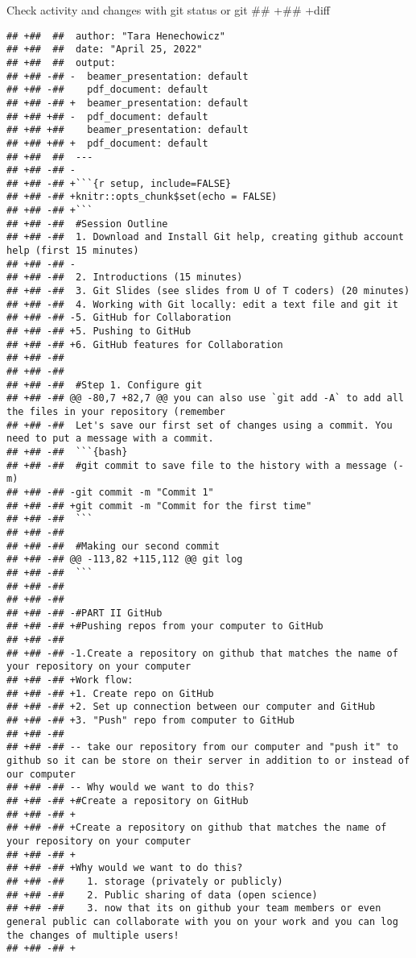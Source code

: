 \documentclass[ignorenonframetext,]{beamer}
\begin{document}
\begin{frame}[fragile]{Check activity and changes with git status or git
## +## +diff}
\begin{verbatim}
## +##  ##  author: "Tara Henechowicz"
## +##  ##  date: "April 25, 2022"
## +##  ##  output:
## +## -## -  beamer_presentation: default
## +## -##    pdf_document: default
## +## -## +  beamer_presentation: default
## +## +## -  pdf_document: default
## +## +##    beamer_presentation: default
## +## +## +  pdf_document: default
## +##  ##  ---
## +## -## -
## +## -## +```{r setup, include=FALSE}
## +## -## +knitr::opts_chunk$set(echo = FALSE)
## +## -## +```
## +## -##  #Session Outline
## +## -##  1. Download and Install Git help, creating github account help (first 15 minutes)
## +## -## -
## +## -##  2. Introductions (15 minutes)
## +## -##  3. Git Slides (see slides from U of T coders) (20 minutes)
## +## -##  4. Working with Git locally: edit a text file and git it
## +## -## -5. GitHub for Collaboration
## +## -## +5. Pushing to GitHub
## +## -## +6. GitHub features for Collaboration
## +## -##  
## +## -##    
## +## -##  #Step 1. Configure git
## +## -## @@ -80,7 +82,7 @@ you can also use `git add -A` to add all the files in your repository (remember
## +## -##  Let's save our first set of changes using a commit. You need to put a message with a commit.
## +## -##  ```{bash}
## +## -##  #git commit to save file to the history with a message (-m)
## +## -## -git commit -m "Commit 1"
## +## -## +git commit -m "Commit for the first time"
## +## -##  ```
## +## -##  
## +## -##  #Making our second commit
## +## -## @@ -113,82 +115,112 @@ git log
## +## -##  ```
## +## -##  
## +## -##  
## +## -## -#PART II GitHub
## +## -## +#Pushing repos from your computer to GitHub
## +## -##  
## +## -## -1.Create a repository on github that matches the name of your repository on your computer
## +## -## +Work flow: 
## +## -## +1. Create repo on GitHub
## +## -## +2. Set up connection between our computer and GitHub
## +## -## +3. "Push" repo from computer to GitHub
## +## -##  
## +## -## -- take our repository from our computer and "push it" to github so it can be store on their server in addition to or instead of our computer
## +## -## -- Why would we want to do this? 
## +## -## +#Create a repository on GitHub
## +## -## +
## +## -## +Create a repository on github that matches the name of your repository on your computer
## +## -## +
## +## -## +Why would we want to do this? 
## +## -##    1. storage (privately or publicly)
## +## -##    2. Public sharing of data (open science)
## +## -##    3. now that its on github your team members or even general public can collaborate with you on your work and you can log the changes of multiple users!
## +## -## +  

\end{verbatim}
\end{frame}
\end{document}
